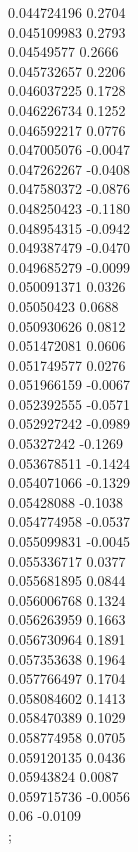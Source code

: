 {        0.044724196	0.2704\\
        0.045109983	0.2793\\
        0.04549577	0.2666\\
        0.045732657	0.2206\\
        0.046037225	0.1728\\
        0.046226734	0.1252\\
        0.046592217	0.0776\\
        0.047005076	-0.0047\\
        0.047262267	-0.0408\\
        0.047580372	-0.0876\\
        0.048250423	-0.1180\\
        0.048954315	-0.0942\\
        0.049387479	-0.0470\\
        0.049685279	-0.0099\\
        0.050091371	0.0326\\
        0.05050423	0.0688\\
        0.050930626	0.0812\\
        0.051472081	0.0606\\
        0.051749577	0.0276\\
        0.051966159	-0.0067\\
        0.052392555	-0.0571\\
        0.052927242	-0.0989\\
        0.05327242	-0.1269\\
        0.053678511	-0.1424\\
        0.054071066	-0.1329\\
        0.05428088	-0.1038\\
        0.054774958	-0.0537\\
        0.055099831	-0.0045\\
        0.055336717	0.0377\\
        0.055681895	0.0844\\
        0.056006768	0.1324\\
        0.056263959	0.1663\\
        0.056730964	0.1891\\
        0.057353638	0.1964\\
        0.057766497	0.1704\\
        0.058084602	0.1413\\
        0.058470389	0.1029\\
        0.058774958	0.0705\\
        0.059120135	0.0436\\
        0.05943824	0.0087\\
        0.059715736	-0.0056\\
        0.06	-0.0109\\
    }
    ;
